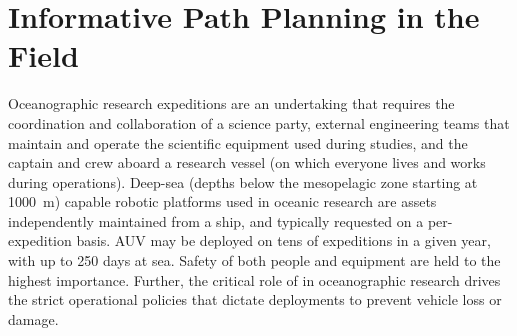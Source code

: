 

\section{Informative Path Planning in the Field}
Oceanographic research expeditions are an undertaking that requires the coordination and collaboration of a science party, external engineering teams that maintain and operate the scientific equipment used during studies, and the captain and crew aboard a research vessel (on which everyone lives and works during operations). Deep-sea (depths below the mesopelagic zone starting at \SI{1000}{\meter}) capable robotic platforms used in oceanic research are assets independently maintained from a ship, and typically requested on a per-expedition basis. AUV \Sentry may be deployed on tens of expeditions in a given year, with up to 250 days at sea. Safety of both people and equipment are held to the highest importance. Further, the critical role of \Sentry in oceanographic research drives the strict operational policies that dictate \Sentry deployments to prevent vehicle loss or damage.

